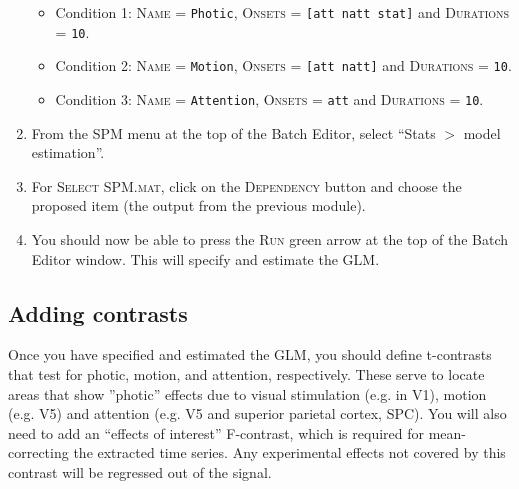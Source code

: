 \begin{enumerate}
\begin{itemize}
  \item Condition 1: \textsc{Name} = \texttt{Photic}, \textsc{Onsets} = \texttt{[att natt stat]} and \textsc{Durations} = \texttt{10}.
  \item Condition 2: \textsc{Name} = \texttt{Motion}, \textsc{Onsets} = \texttt{[att natt]} and \textsc{Durations} = \texttt{10}.
  \item Condition 3: \textsc{Name} = \texttt{Attention}, \textsc{Onsets} = \texttt{att} and \textsc{Durations} = \texttt{10}.
 \end{itemize}
 \item From the SPM menu at the top of the Batch Editor, select ``Stats $>$ model estimation''.
 \item For \textsc{Select SPM.mat}, click on the \textsc{Dependency} button and choose the proposed item (the output from the previous module).
 \item You should now be able to press the \textsc{Run} green arrow at the top of the Batch Editor window. This will specify and estimate the GLM.
\end{enumerate}

\subsection{Adding contrasts}

Once you have specified and estimated the GLM, you should define t-contrasts that test for photic, motion, and attention, respectively. These serve to locate areas that show ''photic'' effects due to visual stimulation (e.g. in V1), motion (e.g. V5) and attention (e.g. V5 and superior parietal cortex, SPC). You will also need to add an ``effects of interest'' F-contrast, which is required for mean-correcting the extracted time series. Any experimental effects not covered by this contrast will be regressed out of the signal.

